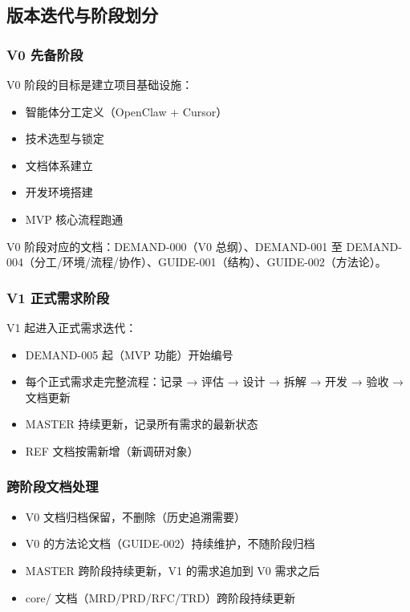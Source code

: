 \documentclass[11pt,a4paper]{article}
\begin{document}
\subsection{版本迭代与阶段划分}

\subsubsection{V0 先备阶段}

V0 阶段的目标是建立项目基础设施：

\begin{itemize}[nosep]
  \item 智能体分工定义（OpenClaw + Cursor）
  \item 技术选型与锁定
  \item 文档体系建立
  \item 开发环境搭建
  \item MVP 核心流程跑通
\end{itemize}

V0 阶段对应的文档：DEMAND-000（V0 总纲）、DEMAND-001 至 DEMAND-004（分工/环境/流程/协作）、GUIDE-001（结构）、GUIDE-002（方法论）。

\subsubsection{V1 正式需求阶段}

V1 起进入正式需求迭代：

\begin{itemize}[nosep]
  \item DEMAND-005 起（MVP 功能）开始编号
  \item 每个正式需求走完整流程：记录 → 评估 → 设计 → 拆解 → 开发 → 验收 → 文档更新
  \item MASTER 持续更新，记录所有需求的最新状态
  \item REF 文档按需新增（新调研对象）
\end{itemize}

\subsubsection{跨阶段文档处理}

\begin{itemize}[nosep]
  \item V0 文档归档保留，不删除（历史追溯需要）
  \item V0 的方法论文档（GUIDE-002）持续维护，不随阶段归档
  \item MASTER 跨阶段持续更新，V1 的需求追加到 V0 需求之后
  \item core/ 文档（MRD/PRD/RFC/TRD）跨阶段持续更新
\end{itemize}
\end{document}
